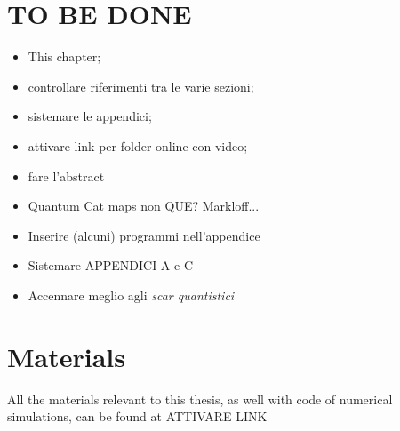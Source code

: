 

\label{Chapter0} %
\thispagestyle{empty}

\section*{TO BE DONE}
\label{sec:intro}


\begin{itemize}
\item This chapter;
\item controllare riferimenti tra le varie sezioni;
\item sistemare le appendici;
\item attivare link per folder online con video;
\item fare l'abstract
\item Quantum Cat maps non QUE? Markloff...
\item Inserire (alcuni) programmi nell'appendice
\item Sistemare APPENDICI A e C
\item Accennare meglio agli \emph{scar quantistici}
\end{itemize}





\section{Materials}


All the materials relevant to this thesis, as well with code of numerical simulations, can be found at ATTIVARE LINK